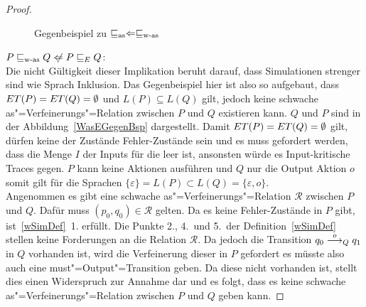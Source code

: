 \begin{proof}
  \begin{figure}[htbp]
    \begin{center}
      \caption{Gegenbeispiel zu $\sqsubseteq _{\mathrm{as}} \Leftarrow \sqsubseteq _{\mathrm{w}\text{-}\mathrm{as}}$}
      \label{asWasGegenBsp}
    \end{center}
  \end{figure}

  $P\wasRel Q\hspace{0.1cm}\not\hspace{-0.1cm}\Leftarrow P\ERel Q$:\\
  Die nicht Gültigkeit dieser Implikation beruht darauf, dass Simulationen
  strenger sind wie Sprach Inklusion. Das Gegenbeispiel hier ist also so
  aufgebaut, dass $ET (P) =ET (Q) = \emptyset$ und $L(P) \subseteq L(Q)$
  gilt, jedoch keine schwache as"=Verfeinerungs"=Relation zwischen $P$ und $Q$
  existieren kann. $Q$ und $P$ sind in der Abbildung~\ref{WasEGegenBsp}
  dargestellt. Damit $ET (P) =ET (Q) = \emptyset$ gilt, dürfen keine der
  Zustände Fehler-Zustände sein und es muss gefordert werden, dass die Menge
  $I$ der Inputs für die \MEIO{} leer ist, ansonsten würde es Input-kritische
  Traces gegen. $P$ kann keine Aktionen ausführen und $Q$ nur die Output Aktion
  $o$ somit gilt für die Sprachen $\{\varepsilon\} = L(P) \subset L(Q) =
  \{\varepsilon , o\}$.\\
  Angenommen es gibt eine schwache as"=Verfeinerungs"=Relation $\mathcal{R}$
  zwischen $P$ und $Q$. Dafür muss $(p_0,q_0)\in \mathcal{R}$ gelten. Da es
  keine Fehler-Zustände in $P$ gibt, ist~\ref{wSimDef}~1. erfüllt. Die
  Punkte 2., 4.\ und 5.\ der Definition~\ref{wSimDef} stellen keine
  Forderungen an die Relation $\mathcal{R}$. Da jedoch die Transition $q_0
  \must[o]_Q q_1$ in $Q$ vorhanden ist, wird die Verfeinerung dieser in $P$
  gefordert es müsste also auch eine must"=Output"=Transition geben. Da diese
  nicht vorhanden ist, stellt dies einen Widerspruch zur Annahme dar und es
  folgt, dass es keine schwache as"=Verfeinerungs"=Relation zwischen $P$ und
  $Q$ geben kann.


\end{proof}
